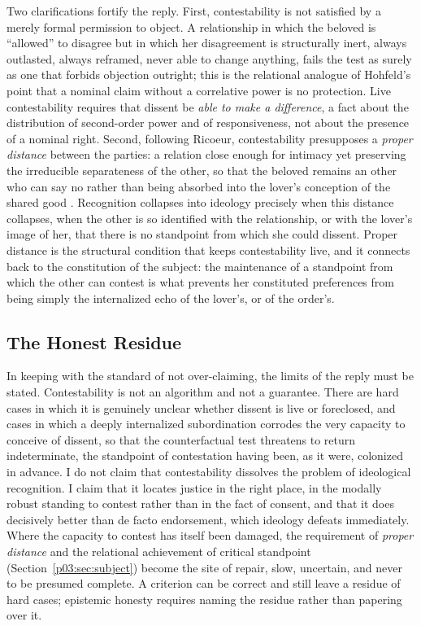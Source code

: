 Two clarifications fortify the reply. First, contestability is not satisfied by a merely formal permission to object. A relationship in which the beloved is ``allowed'' to disagree but in which her disagreement is structurally inert, always outlasted, always reframed, never able to change anything, fails the test as surely as one that forbids objection outright; this is the relational analogue of Hohfeld's point that a nominal claim without a correlative power is no protection. Live contestability requires that dissent be \emph{able to make a difference}, a fact about the distribution of second-order power and of responsiveness, not about the presence of a nominal right. Second, following Ricoeur, contestability presupposes a \emph{proper distance} between the parties: a relation close enough for intimacy yet preserving the irreducible separateness of the other, so that the beloved remains an other who can say no rather than being absorbed into the lover's conception of the shared good \parencite{ricoeur2005course}. Recognition collapses into ideology precisely when this distance collapses, when the other is so identified with the relationship, or with the lover's image of her, that there is no standpoint from which she could dissent. Proper distance is the structural condition that keeps contestability live, and it connects back to the constitution of the subject: the maintenance of a standpoint from which the other can contest is what prevents her constituted preferences from being simply the internalized echo of the lover's, or of the order's.

\subsection{The Honest Residue}

In keeping with the standard of not over-claiming, the limits of the reply must be stated. Contestability is not an algorithm and not a guarantee. There are hard cases in which it is genuinely unclear whether dissent is live or foreclosed, and cases in which a deeply internalized subordination corrodes the very capacity to conceive of dissent, so that the counterfactual test threatens to return indeterminate, the standpoint of contestation having been, as it were, colonized in advance. I do not claim that contestability dissolves the problem of ideological recognition. I claim that it locates justice in the right place, in the modally robust standing to contest rather than in the fact of consent, and that it does decisively better than de facto endorsement, which ideology defeats immediately. Where the capacity to contest has itself been damaged, the requirement of \emph{proper distance} and the relational achievement of critical standpoint (Section~\ref{p03:sec:subject}) become the site of repair, slow, uncertain, and never to be presumed complete. A criterion can be correct and still leave a residue of hard cases; epistemic honesty requires naming the residue rather than papering over it.

